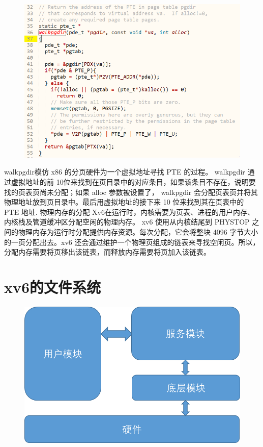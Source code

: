 \documentclass[a4paper,12pt]{report}
\begin{document}
\begin{figure}[H]
	\centering
	\includegraphics [width=1.0\textwidth]{figure//media//image9.png}
\end{figure}
walkpgdir模仿 x86 的分页硬件为一个虚拟地址寻找 PTE 的过程。 walkpgdir 通过虚拟地址的前 10位来找到在页目录中的对应条目，如果该条目不存在，说明要找的页表页尚未分配；如果 alloc 参数被设置了， walkpgdir 会分配页表页并将其物理地址放到页目录中。最后用虚拟地址的接下来 10 位来找到其在页表中的 PTE 地址.
物理内存的分配
Xv6在运行时，内核需要为页表、进程的用户内存、内核栈及管道缓冲区分配空闲的物理内存。
xv6 使用从内核结尾到 PHYSTOP 之间的物理内存为运行时分配提供内存资源。每次分配，它会将整块 4096 字节大小的一页分配出去。xv6 还会通过维护一个物理页组成的链表来寻找空闲页。所以，分配内存需要将页移出该链表，而释放内存需要将页加入该链表。


\section{xv6的文件系统}
\begin{figure}[H]
	\centering
	\includegraphics [width=1.0\textwidth]{figure//image147.png}
\end{figure}
\end{document}
